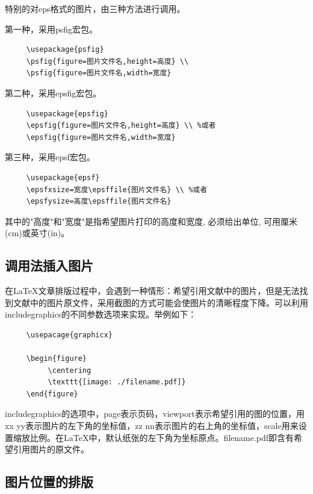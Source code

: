\documentclass[12pt]{book}
\begin{document}
特别的对eps格式的图片，由三种方法进行调用。

第一种，采用psfig宏包。

\begin{verbatim}
     \usepackage{psfig}
     \psfig{figure=图片文件名,height=高度} \\
     \psfig{figure=图片文件名,width=宽度}
\end{verbatim}

第二种，采用epsfig宏包。

\begin{verbatim}
     \usepackage{epsfig}
     \epsfig{figure=图片文件名,height=高度} \\ %或者
     \epsfig{figure=图片文件名,width=宽度}
\end{verbatim}


第三种，采用epsf宏包。

\begin{verbatim}
     \usepackage{epsf}
     \epsfxsize=宽度\epsffile{图片文件名} \\ %或者
     \epsfysize=高度\epsffile{图片文件名}
\end{verbatim}

其中的"高度"和"宽度"是指希望图片打印的高度和宽度, 必须给出单位, 可用厘米(cm)或英寸(in)。

\subsection{调用法插入图片}


在\LaTeX{}文章排版过程中，会遇到一种情形：希望引用文献中的图片，但是无法找到文献中的图片原文件，采用截图的方式可能会使图片的清晰程度下降。可以利用includegraphics的不同参数选项来实现。举例如下：
\begin{verbatim}
     \usepacage{graphicx}
     
     \begin{figure}
          \centering
          \texttt{[image: ./filename.pdf]}
     \end{figure}
\end{verbatim}

includegraphics的选项中，page表示页码，viewport表示希望引用的图的位置，用xx yy表示图片的左下角的坐标值，zz nn表示图片的右上角的坐标值，scale用来设置缩放比例。在\LaTeX{}中，默认纸张的左下角为坐标原点。filename.pdf即含有希望引用图片的原文件。

\subsection{图片位置的排版}
\end{document}
